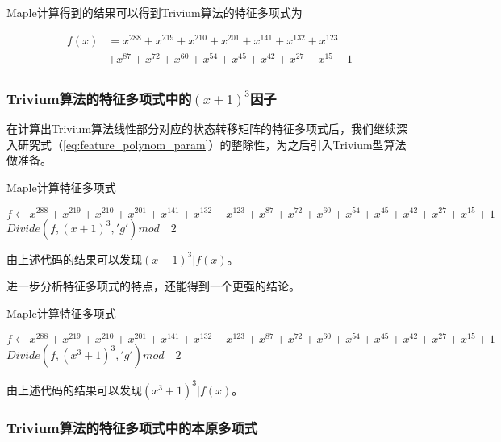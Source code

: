 Maple计算得到的结果可以得到Trivium算法的特征多项式为

\[\begin{split}
f(x)&=x^{288}+x^{219}+x^{210}+x^{201}+x^{141}+x^{132}+x^{123}\\
&+x^{87}+x^{72}+x^{60}+x^{54}+x^{45}+x^{42}+x^{27}+x^{15}+1\\
\end{split}\]
\begin{equation}
\label{eq:feature_polynom}
\end{equation}

\subsubsection{Trivium算法的特征多项式中的$(x+1)^3$因子}

在计算出Trivium算法线性部分对应的状态转移矩阵的特征多项式后，我们继续深入研究式（\ref{eq:feature_polynom_param}）的整除性，为之后引入Trivium型算法做准备。

\begin{algorithm}[H]
  \caption{Maple计算特征多项式}
  \label{algo:trivium_maple_function}
  \begin{algorithmic}
      
	   \STATE $f \leftarrow x^{288}+x^{219}+x^{210}+x^{201}+x^{141}+x^{132}+x^{123}+x^{87}+x^{72}+x^{60}+x^{54}+x^{45}+x^{42}+x^{27}+x^{15}+1$
       \STATE $Divide(f,(x+1)^{3},'g') mod \quad 2$

  \end{algorithmic}
\end{algorithm}

由上述代码的结果可以发现$(x+1)^3|f(x)$。


进一步分析特征多项式的特点，还能得到一个更强的结论。

\begin{algorithm}[H]
  \caption{Maple计算特征多项式}
  \label{algo:trivium_maple_function}
  \begin{algorithmic}
      
	   \STATE $f \leftarrow x^{288}+x^{219}+x^{210}+x^{201}+x^{141}+x^{132}+x^{123}+x^{87}+x^{72}+x^{60}+x^{54}+x^{45}+x^{42}+x^{27}+x^{15}+1$
       \STATE $Divide(f,(x^{3}+1)^{3},'g') mod \quad 2$

  \end{algorithmic}
\end{algorithm}

由上述代码的结果可以发现$(x^3+1)^3|f(x)$。

\subsubsection{Trivium算法的特征多项式中的本原多项式}

